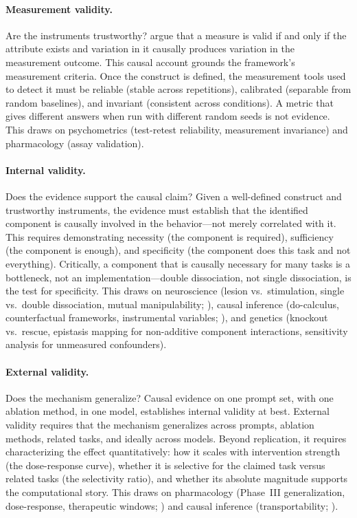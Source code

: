 \documentclass{article}
\begin{document}
\paragraph{Measurement validity.} Are the instruments trustworthy? \citet{borsboom2004concept} argue that a measure is valid if and only if the attribute exists and variation in it causally produces variation in the measurement outcome. This causal account grounds the framework's measurement criteria. Once the construct is defined, the measurement tools used to detect it must be reliable (stable across repetitions), calibrated (separable from random baselines), and invariant (consistent across conditions). A metric that gives different answers when run with different random seeds is not evidence. This draws on psychometrics (test-retest reliability, measurement invariance) and pharmacology (assay validation).

\paragraph{Internal validity.} Does the evidence support the causal claim? Given a well-defined construct and trustworthy instruments, the evidence must establish that the identified component is causally involved in the behavior---not merely correlated with it. This requires demonstrating necessity (the component is required), sufficiency (the component is enough), and specificity (the component does this task and not everything). Critically, a component that is causally necessary for many tasks is a bottleneck, not an implementation---double dissociation, not single dissociation, is the test for specificity. This draws on neuroscience (lesion vs.\ stimulation, single vs.\ double dissociation, mutual manipulability; \citealp{shallice1988neuropsychology, craver2007explaining}), causal inference (do-calculus, counterfactual frameworks, instrumental variables; \citealp{pearl2009causality}), and genetics (knockout vs.\ rescue, epistasis mapping for non-additive component interactions, sensitivity analysis for unmeasured confounders).

\paragraph{External validity.} Does the mechanism generalize? Causal evidence on one prompt set, with one ablation method, in one model, establishes internal validity at best. External validity requires that the mechanism generalizes across prompts, ablation methods, related tasks, and ideally across models. Beyond replication, it requires characterizing the effect quantitatively: how it scales with intervention strength (the dose-response curve), whether it is selective for the claimed task versus related tasks (the selectivity ratio), and whether its absolute magnitude supports the computational story. This draws on pharmacology (Phase~III generalization, dose-response, therapeutic windows; \citealp{rang2006drug}) and causal inference (transportability; \citealp{pearl2011transportability}).
\end{document}
